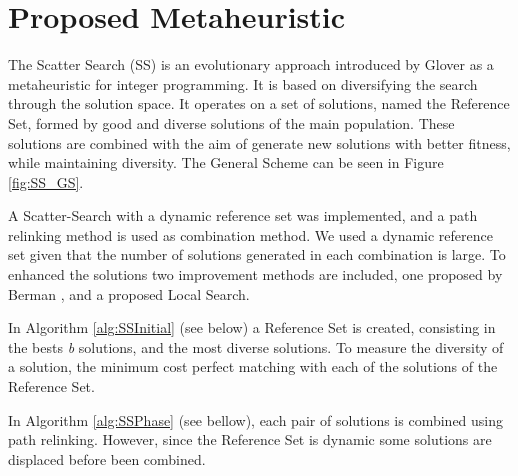 \section{Proposed Metaheuristic}
The Scatter Search (SS)
is an evolutionary approach
introduced by Glover \cite{glover1977heuristics}
as a metaheuristic for integer programming.
It is based on diversifying the search
through the solution space.
It operates on a set of solutions,
named the Reference Set,
formed by good and diverse solutions of the main population.
These solutions are combined
with the aim of generate
new solutions with better fitness,
while maintaining diversity.
The General Scheme can be seen in Figure \ref{fig:SS_GS}.


A Scatter-Search
with a dynamic reference set
was implemented,
and a path relinking method
is used as combination method.
We used a dynamic reference set
given that the number of solutions generated
in each combination is large.
To enhanced the solutions
two improvement methods are included,
one proposed by Berman \cite{berman1987stochastic},
and a proposed Local Search.

In Algorithm \ref{alg:SSInitial} (see below)
a Reference Set is created,
consisting in the bests \textit{b} solutions,
and the most diverse  solutions.
To measure the diversity of a solution,
the minimum cost perfect matching
with each of the solutions of the Reference Set.


In Algorithm \ref{alg:SSPhase} (see bellow),
each pair of solutions
is combined using path relinking.
However,
since the Reference Set is dynamic
some solutions are displaced
before been combined.

